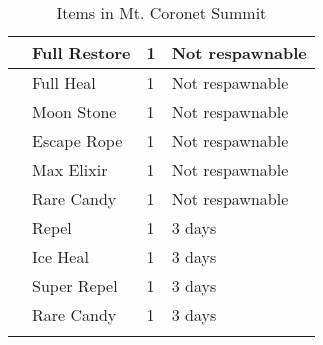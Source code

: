 \begin{longtable}{|| l l l l ||}%
\hline%
&Full Restore&1&Not respawnable\\%
\hline%
&Full Heal&1&Not respawnable\\%
\hline%
&Moon Stone&1&Not respawnable\\%
\hline%
&Escape Rope&1&Not respawnable\\%
\hline%
&Max Elixir&1&Not respawnable\\%
\hline%
&Rare Candy&1&Not respawnable\\%
\hline%
&Repel&1&3 days\\%
\hline%
&Ice Heal&1&3 days\\%
\hline%
&Super Repel&1&3 days\\%
\hline%
&Rare Candy&1&3 days\\%
\hline%
\endhead%
\hline%
\caption{Items in Mt. Coronet Summit}%
\label{tab:Mt.CoronetSummitItems}%
\end{longtable}